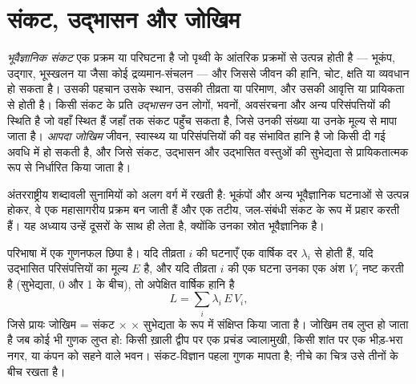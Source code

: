 \section{संकट, उद्भासन और जोखिम}\label{sec:b2:geological-hazards:risk}

\begin{definition}[भूवैज्ञानिक संकट, उद्भासन, आपदा जोखिम]\label{def:b2:geological-hazards:risk}
\emph{भूवैज्ञानिक संकट} एक प्रक्रम या परिघटना है जो पृथ्वी के आंतरिक
प्रक्रमों से उत्पन्न होती है --- भूकंप, उद्गार, भूस्खलन या  जैसा कोई
द्रव्यमान-संचलन --- और जिससे जीवन की हानि, चोट, क्षति या व्यवधान हो सकता है। उसकी पहचान
उसके स्थान, उसकी तीव्रता या परिमाण, और उसकी आवृत्ति या प्रायिकता से होती है। किसी संकट के प्रति
\emph{उद्भासन} उन लोगों, भवनों, अवसंरचना और अन्य परिसंपत्तियों की
स्थिति है जो वहाँ स्थित हैं जहाँ तक संकट पहुँच सकता है, जिसे उनकी संख्या या उनके मूल्य से मापा जाता है।
\emph{आपदा जोखिम} जीवन, स्वास्थ्य या परिसंपत्तियों की वह संभावित हानि है जो किसी
दी गई अवधि में हो सकती है, और जिसे संकट, उद्भासन और उद्भासित वस्तुओं की सुभेद्यता से
प्रायिकतात्मक रूप से निर्धारित किया जाता है।
\end{definition}

अंतरराष्ट्रीय शब्दावली सुनामियों को अलग वर्ग में रखती है: भूकंपों और अन्य भूवैज्ञानिक घटनाओं से उत्पन्न होकर,
वे एक महासागरीय प्रक्रम बन जाती हैं और एक तटीय, जल-संबंधी संकट के रूप में प्रहार करती हैं।
यह अध्याय उन्हें दूसरों के साथ ही लेता है, क्योंकि उनका स्रोत भूवैज्ञानिक है।

परिभाषा में एक गुणनफल छिपा है। यदि तीव्रता $i$ की घटनाएँ एक वार्षिक दर
$\lambda_i$ से होती हैं, यदि उद्भासित परिसंपत्तियों का मूल्य $E$ है, और यदि तीव्रता $i$ की एक घटना उनका
एक अंश $V_i$ नष्ट करती है (सुभेद्यता, 0 और 1 के बीच), तो अपेक्षित वार्षिक हानि है
\begin{equation}
L = \sum_i \lambda_i \, E \, V_i ,
\label{eq:b2:geological-hazards:loss}
\end{equation}
जिसे प्रायः जोखिम = संकट $\times$  $\times$ सुभेद्यता के रूप में संक्षिप्त किया जाता है। जोखिम तब
लुप्त हो जाता है जब कोई भी गुणक लुप्त हो: किसी ख़ाली द्वीप पर एक प्रचंड ज्वालामुखी, किसी शांत  पर एक
भीड़-भरा नगर, या कंपन को सहने वाले भवन। संकट-विज्ञान पहला गुणक मापता है; नीचे का चित्र
उसे तीनों के बीच रखता है।

